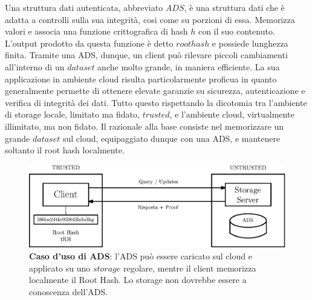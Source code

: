 		Una struttura dati autenticata, abbreviato $ ADS $, è una struttura dati che è adatta a controlli sulla sua integrità, cosi come su porzioni di essa. Memorizza valori e associa una funzione crittografica di hash $ h $ con il suo contenuto. L'output prodotto da questa funzione è detto $root hash$ e possiede lunghezza finita. Tramite una ADS, dunque, un client può rilevare piccoli cambiamenti all'interno di un $ dataset $ anche molto grande, in maniera efficiente.
		La sua applicazione in ambiente cloud risulta particolarmente proficua in quanto generalmente permette di ottenere elevate garanzie su sicurezza, autenticazione e verifica di integrità dei dati. Tutto questo rispettando la dicotomia tra l'ambiente di storage locale, limitato ma fidato, $ trusted $, e l'ambiente cloud, virtualmente illimitato, ma non fidato. Il razionale alla base consiste nel memorizzare un grande $ dataset$ sul cloud, equipaggiato dunque con una ADS, e mantenere soltanto il root hash localmente.
		
		\begin{figure}
			\centering
			\includegraphics[scale=0.75]{figure/trusted-untrusted.eps}
			\caption{\textbf{Caso d'uso di ADS}: l'ADS può essere caricato sul cloud e applicato su uno $ storage $ regolare, mentre il client memorizza localmente il Root Hash. Lo storage non dovrebbe essere a conoscenza dell'ADS.}\label{fig:3}
		\end{figure}
		
